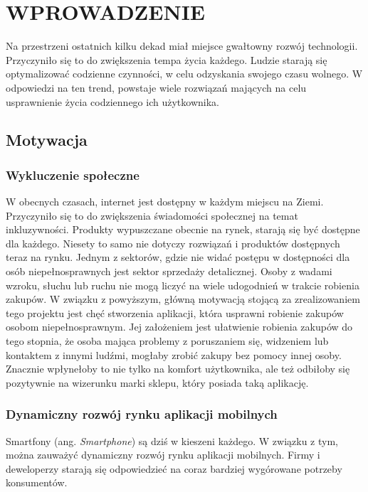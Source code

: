 \chapter{WPROWADZENIE}
\label{chapter:wprowadzenie}

Na przestrzeni ostatnich kilku dekad miał miejsce gwałtowny rozwój technologii. Przyczyniło się to do zwiększenia tempa życia każdego. Ludzie starają się optymalizować codzienne czynności, w celu odzyskania swojego czasu wolnego. W odpowiedzi na ten trend, powstaje wiele rozwiązań mających na celu usprawnienie życia codziennego ich użytkownika. 

\section{Motywacja}

\subsection{Wykluczenie społeczne}

W obecnych czasach, internet jest dostępny w każdym miejscu na Ziemi. Przyczyniło się to do zwiększenia świadomości społecznej na temat inkluzywności. Produkty wypuszczane obecnie na rynek, starają się być dostępne dla każdego. Niesety to samo nie dotyczy rozwiązań i produktów dostępnych teraz na rynku. Jednym z sektorów, gdzie nie widać postępu w dostępności dla osób niepełnosprawnych jest sektor sprzedaży detalicznej. Osoby z wadami wzroku, słuchu lub ruchu nie mogą liczyć na wiele udogodnień w trakcie robienia zakupów.
W związku z powyższym, główną motywacją stojącą za zrealizowaniem tego projektu jest chęć stworzenia aplikacji, która usprawni robienie zakupów osobom niepełnosprawnym. Jej założeniem jest ułatwienie robienia zakupów do tego stopnia, że osoba mająca problemy z poruszaniem się, widzeniem lub kontaktem z innymi ludźmi, mogłaby zrobić zakupy bez pomocy innej osoby. Znacznie wpłynełoby to nie tylko na komfort użytkownika, ale też odbiłoby się pozytywnie na wizerunku marki sklepu, który posiada taką aplikację.

\subsection{Dynamiczny rozwój rynku aplikacji mobilnych}

Smartfony (ang. \textit{Smartphone}) są dziś w kieszeni każdego. W związku z tym, można zauważyć dynamiczny rozwój rynku aplikacji mobilnych. Firmy i deweloperzy starają się odpowiedzieć na coraz bardziej wygórowane potrzeby konsumentów.

